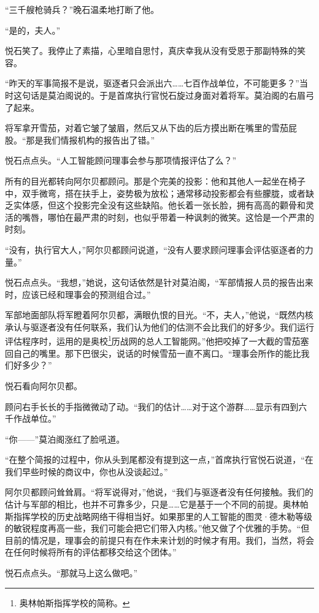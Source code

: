 \documentclass[AutoFakeBold=true]{book}
\begin{document}
``三千艘枪骑兵？''晚石温柔地打断了他。

``是的，夫人。''

悦石笑了。我停止了素描，心里暗自思忖，真庆幸我从没有受恩于那副特殊的笑容。

``昨天的军事简报不是说，驱逐者只会派出六……七百作战单位，{\kaishu 不可能更多}？''当时这句话是莫泊阁说的。于是首席执行官悦石旋过身面对着将军。莫泊阁的右眉弓了起来。

将军拿开雪茄，对着它皱了皱眉，然后又从下齿的后方摸出断在嘴里的雪茄屁股。``那是我们情报机构的报告出了错。''

悦石点点头。``人工智能顾问理事会参与那项情报评估了么？''

所有的目光都转向阿尔贝都顾问。那是个完美的投影：他和其他人一起坐在椅子中，双手微弯，搭在扶手上，姿势极为放松；通常移动投影都会有些朦胧，或者缺乏实体感，但这个投影完全没有这些缺陷。他长着一张长脸，拥有高高的颧骨和灵活的嘴唇，哪怕在最严肃的时刻，也似乎带着一种讽刺的微笑。这恰是一个严肃的时刻。

``没有，执行官大人，''阿尔贝都顾问说道，``没有人要求顾问理事会评估驱逐者的力量。''

悦石点点头。``我想，''她说，这句话依然是针对莫泊阁，``军部情报人员的报告出来时，应该已经和理事会的预测组合过。''

军部地面部队将军瞪着阿尔贝都，满眼仇恨的目光。``不，夫人，''他说，``既然内核承认与驱逐者没有任何联系，我们认为他们的估测不会比我们的好多少。我们运行评估程序时，运用的是奥校\footnote{奥林帕斯指挥学校的简称。}历战网的总人工智能网。''他把咬掉了一大截的雪茄塞回自己的嘴里。那下巴很尖，说话的时候雪茄一直不离口。``理事会所作的能比我们好多少？''

悦石看向阿尔贝都。

顾问右手长长的手指微微动了动。``我们的估计……对于这个游群……显示有四到六千作战单位。''

``你——''莫泊阁涨红了脸吼道。

``在整个简报的过程中，你从头到尾都没有提到这一点，''首席执行官悦石说道，``在我们早些时候的商议中，你也从没谈起过。''

阿尔贝都顾问耸耸肩。``将军说得对，''他说，``我们与驱逐者没有任何接触。我们的估计与军部的相比，也并不可靠多少，只是……它是基于一个不同的前提。奥林帕斯指挥学校的历史战略网络干得相当好。如果那里的人工智能的图灵·德木勒等级的敏锐程度再高一些，我们可能会把它们带入内核。''他又做了个优雅的手势。``但目前的情况是，理事会的前提只有在作未来计划的时候才有用。我们，当然，将会在任何时候将所有的评估都移交给这个团体。''

悦石点点头。``那就马上这么做吧。''
\end{document}
